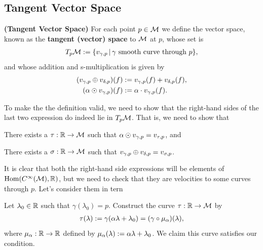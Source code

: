 \documentclass[12pt]{article} %
\newcommand{\bfs}[1]{\textbf{({#1}) }}
\begin{document}
\subsection{Tangent Vector Space}
\bd\bfs{Tangent Vector Space}
    For each point $p\in\mathcal{M}$ we define the vector space, known as the \textbf{tangent (vector) space} to $\mathcal{M}$ at $p$, whose set is
    \begin{align*} 
        T_p\mathcal{M} := \{ v_{\gamma,p} \,| \, \gamma \text{ smooth curve through } p\},
    \end{align*} 
    and whose addition and s-multiplication is given by 
    \begin{align*} 
        \begin{split}
            (v_{\gamma,p}\oplus v_{\delta,p}) (f )& := v_{\gamma,p}(f)+ v_{\delta,p}(f), \\
            (\alpha\odot v_{\gamma,p})(f)& := \alpha \cdot v_{\gamma,p}(f).
        \end{split}
    \end{align*} 
\ed 
\begin{lema}
 To make the the definition valid, we need to show that the right-hand sides of the last two expression do indeed lie in $T_p\mathcal{M}$. That is, we need to show that
\benr 
    \item There exists a $\tau:\mathbb{R}\to\mathcal{M}$ such that $\alpha\odot v_{\gamma,p}= v_{\tau,p}$, and 
    \item There exists a $\sigma:\mathbb{R}\to\mathcal{M}$ such that $v_{\gamma,p}\oplus v_{\delta,p} = v_{\sigma,p}$. 
\een
\end{lema}
\bq 
    It is clear that both the right-hand side expressions will be elements of $\text{Hom}(C^{\infty}(\mathcal{M}),\mathbb{R})$, but we need to check that they are velocities to some curves through $p$. Let's consider them in tern
    \benr 
        \item Let $\lambda_0\in\mathbb{R}$ such that $\gamma(\lambda_0)=p$. Construct the curve $\tau:\mathbb{R}\to\mathcal{M}$ by 
        \begin{align*} 
            \tau(\lambda) := \gamma(\alpha\lambda +  \lambda_0) = (\gamma\circ \mu_{\alpha})(\lambda),
        \end{align*} 
        where $\mu_{\alpha}:\mathbb{R}\to\mathbb{R}$ defined by $\mu_{\alpha}(\lambda) := \alpha\lambda + \lambda_0$. We claim this curve satisfies our condition. 
        
\end{document}
